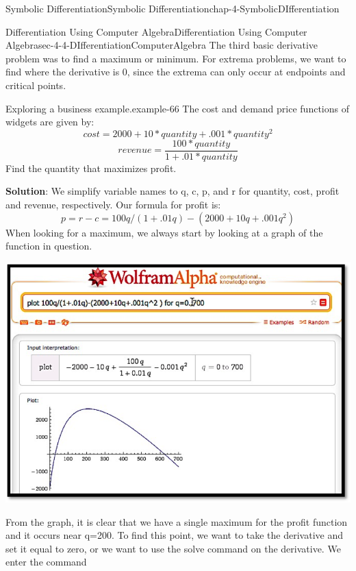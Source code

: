 \documentclass[oneside,10pt,]{book}
\newcommand{\terminology}[1]{\textbf{#1}}
\numberwithin{equation}{section}
\begin{document}
\begin{chapterptx}{Symbolic Differentiation}{}{Symbolic Differentiation}{}{}{chap-4-SymbolicDIfferentiation}
\begin{sectionptx}{Differentiation Using Computer Algebra}{}{Differentiation Using Computer Algebra}{}{}{sec-4-4-DIfferentiationComputerAlgebra}
\hypertarget{p-1727}{}%
The third basic derivative problem was to find a maximum or minimum.  For extrema problems, we want to find where the derivative is 0, since the extrema can only occur at endpoints and critical points.%
\begin{example}{Exploring a business example.}{example-66}%
\hypertarget{p-1728}{}%
The cost and demand price functions of widgets are given by:%
%
\begin{equation*}
cost=2000+10*quantity+.001*quantity^2
\end{equation*}
%
\begin{equation*}
revenue=\frac{100*quantity}{1+.01*quantity}
\end{equation*}
\hypertarget{p-1729}{}%
Find the quantity that maximizes profit.%
\par
\hypertarget{p-1730}{}%
\terminology{Solution}: We simplify variable names to q, c, p, and r for quantity, cost, profit and revenue, respectively.  Our formula for profit is:%
%
\begin{equation*}
p=r-c=100q/(1+.01q)-(2000+10q+.001q^2 )
\end{equation*}
\hypertarget{p-1731}{}%
When looking for a maximum, we always start by looking at a graph of the function in question.%
\begin{sidebyside}{1}{0.1}{0.1}{0}%
\begin{sbspanel}{0.8}%
\includegraphics[width=1\linewidth]{images/sec4-4-6.png}
\end{sbspanel}%
\end{sidebyside}%
\par
\hypertarget{p-1732}{}%
From the graph, it is clear that we have a single maximum for the profit function and it occurs near q=200.  To find this point, we want to take the derivative and set it equal to zero, or we want to use the solve command on the derivative.  We enter the command%

\end{example}
\end{sectionptx}
\end{chapterptx}
\end{document}
